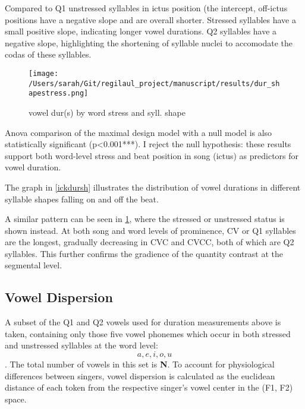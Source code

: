 Compared to Q1 unstressed syllables in ictus position (the intercept,  off-ictus positions have a negative slope and are overall shorter. Stressed syllables have a small positive slope, indicating longer vowel durations. Q2 syllables have a negative slope, highlighting the shortening of syllable nuclei to accomodate the codas of these syllables. 


\begin{figure}[htbp]
\centering
\texttt{[image: /Users/sarah/Git/regilaul\_project/manuscript/results/dur\_shapestress.png]}
\caption{vowel dur(s) by word stress and syll. shape}
\label{strdursh}

\end{figure}
Anova comparison of the maximal design model with a null model is also statistically significant (p<0.001***). I reject the null hypothesis: these results support both word-level stress and beat position in song (ictus) as predictors for vowel duration. 

The graph in \ref{ickdursh} illustrates the distribution of vowel durations in different syllable shapes falling on and off the beat. 

A similar pattern can be seen in \ref{strdursh}, where the stressed or unstressed status is shown instead. At both song and word levels of prominence, CV or Q1 syllables are the longest, gradually decreasing in CVC and CVCC, both of which are Q2 syllables.  This further confirms the gradience of the quantity contrast at the segmental level. 




%

\subsection{Vowel Dispersion}
A subset of the Q1 and Q2 vowels used for duration measurements above is taken,  containing only those five vowel phonemes which occur in both stressed and unstressed syllables at the word level: \[a, e, i, o, u\]. The total number of vowels in this set is {\bf N}.
To account for physiological differences between singers, vowel dispersion is calculated as the euclidean distance of each token from the respective singer's vowel center in the (F1, F2) space. 


